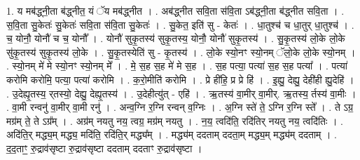 \documentclass[17pt]{extarticle}
\begin{document}
1. य मब॑द्ध्नी॒ता ब॑द्ध्नीत॒ यं ॅय मब॑द्ध्नीत । . अब॑द्ध्नीत सवि॒ता स॑वि॒ता ऽब॑द्ध्नी॒ता ब॑द्ध्नीत सवि॒ता । . स॒वि॒ता सु॒केतः॑ सु॒केतः॑ सवि॒ता स॑वि॒ता सु॒केतः॑ । . सु॒केत॒ इति॑ सु - केतः॑ । . धा॒तुश्च॑ च धा॒तुर् धा॒तुश्च॑ । . च॒ योनौ॒ योनौ॑ च च॒ योनौ᳚ । . योनौ॑ सुकृ॒तस्य॑ सुकृ॒तस्य॒ योनौ॒ योनौ॑ सुकृ॒तस्य॑ । . सु॒कृ॒तस्य॑ लो॒के लो॒के सु॑कृ॒तस्य॑ सुकृ॒तस्य॑ लो॒के । . सु॒कृ॒तस्येति॑ सु - कृ॒तस्य॑ । . लो॒के स्यो॒नꣳ स्यो॒नम् ॅलो॒के लो॒के स्यो॒नम् । . स्यो॒नम् मे॑ मे स्यो॒नꣳ स्यो॒नम् मे᳚ । . मे॒ स॒ह स॒ह मे॑ मे स॒ह । . स॒ह पत्या॒ पत्या॑ स॒ह स॒ह पत्या᳚ । . पत्या॑ करोमि करोमि॒ पत्या॒ पत्या॑ करोमि । . क॒रो॒मीति॑ करोमि । . प्रे ही॑हि॒ प्र प्रे हि॑ । . इ॒ह्यु॒ देह्यु॒ देही॑ही ह्यु॒देहि॑ । . उ॒देह्यृ॒तस्य॒ र्‌तस्यो॒ देह्यु॒ देह्यृ॒तस्य॑ । . उ॒देहीत्यु॑त् - एहि॑ । . ऋ॒तस्य॑ वा॒मीर् वा॒मीर्. ऋ॒तस्य॒ र्तस्य॑ वा॒मीः । . वा॒मी रन्वनु॑ वा॒मीर् वा॒मी रनु॑ । . अन्व॒ग्नि र॒ग्नि रन्वन् व॒ग्निः । . अ॒ग्नि स्ते॑ ते॒ ऽग्नि र॒ग्नि स्ते᳚ । . ते ऽग्र॒ मग्र॑म् ते॒ ते ऽग्र᳚म् । . अग्र॑म् नयतु नय॒ त्वग्र॒ मग्र॑म् नयतु । . न॒य॒ त्वदि॑ति॒ रदि॑तिर् नयतु नय॒ त्वदि॑तिः । . अदि॑ति॒र् मद्ध्य॒म् मद्ध्य॒ मदि॑ति॒ रदि॑ति॒र् मद्ध्य᳚म् । . मद्ध्य॑म् ददताम् ददता॒म् मद्ध्य॒म् मद्ध्य॑म् ददताम् । . द॒द॒ताꣳ॒॒ रु॒द्राव॑सृष्टा रु॒द्राव॑सृष्टा ददताम् ददताꣳ रु॒द्राव॑सृष्टा । \newline
\end{document}
